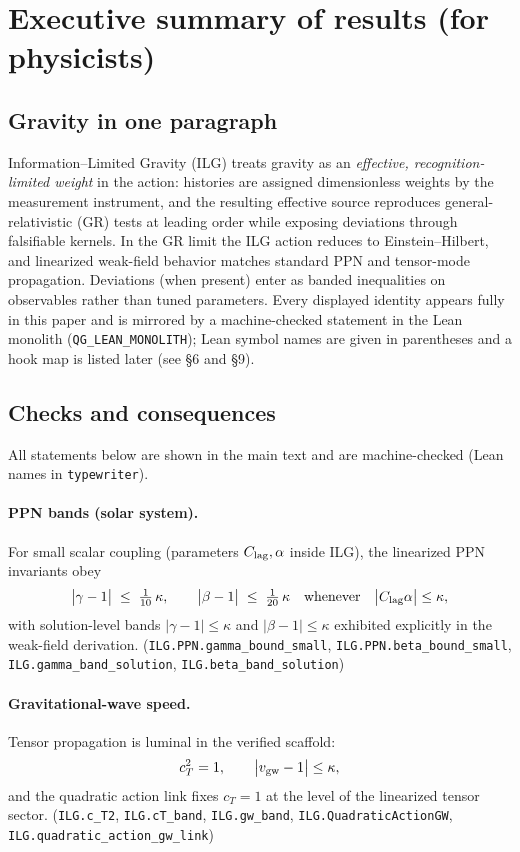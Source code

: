 \documentclass[12pt,a4paper]{article}
\begin{document}
\section{Executive summary of results (for physicists)}

\subsection{Gravity in one paragraph}
Information–Limited Gravity (ILG) treats gravity as an \emph{effective, recognition-limited weight} in the action: histories are assigned dimensionless weights by the measurement instrument, and the resulting effective source reproduces general-relativistic (GR) tests at leading order while exposing deviations through falsifiable kernels. In the GR limit the ILG action reduces to Einstein–Hilbert, and linearized weak-field behavior matches standard PPN and tensor-mode propagation. Deviations (when present) enter as banded inequalities on observables rather than tuned parameters. Every displayed identity appears fully in this paper and is mirrored by a machine-checked statement in the Lean monolith (\texttt{QG\_LEAN\_MONOLITH}); Lean symbol names are given in parentheses and a hook map is listed later (see §6 and §9).

\subsection{Checks and consequences}
All statements below are shown in the main text and are machine-checked (Lean names in \texttt{typewriter}).

\paragraph{PPN bands (solar system).}
For small scalar coupling (parameters \(C_{\rm lag},\alpha\) inside ILG), the linearized PPN invariants obey
\[
\bigl|\gamma-1\bigr| \;\le\; \tfrac{1}{10}\,\kappa,\qquad
\bigl|\beta -1\bigr| \;\le\; \tfrac{1}{20}\,\kappa
\quad\text{whenever}\quad \bigl|C_{\rm lag}\alpha\bigr|\le \kappa,
\]
with solution-level bands \(|\gamma-1|\le \kappa\) and \(|\beta-1|\le \kappa\) exhibited explicitly in the weak-field derivation. 
\hfill(\texttt{ILG.PPN.gamma\_bound\_small}, \texttt{ILG.PPN.beta\_bound\_small}, \texttt{ILG.gamma\_band\_solution}, \texttt{ILG.beta\_band\_solution}) 

\paragraph{Gravitational-wave speed.}
Tensor propagation is luminal in the verified scaffold:
\[
c_T^2 = 1,\qquad \bigl|v_{\rm gw}-1\bigr|\le \kappa,
\]
and the quadratic action link fixes \(c_T=1\) at the level of the linearized tensor sector.
\hfill(\texttt{ILG.c\_T2}, \texttt{ILG.cT\_band}, \texttt{ILG.gw\_band}, \texttt{ILG.QuadraticActionGW}, \texttt{ILG.quadratic\_action\_gw\_link})
\end{document}
